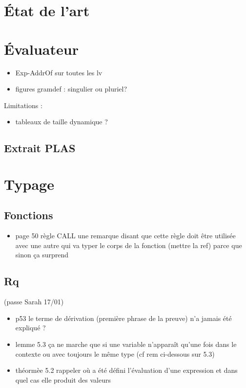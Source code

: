 \section{État de l'art}%



\section{Évaluateur} %

\begin{itemize}
\item Exp-AddrOf sur toutes les lv
\item figures gramdef : singulier ou pluriel?
\end{itemize}

Limitations :

\begin{itemize}
\item tableaux de taille dynamique ?
\end{itemize}

\subsection*{Extrait PLAS}




\section{Typage}%

\subsection*{Fonctions}

\begin{itemize}
\item
  page 50 règle CALL une remarque disant que cette règle doit être
  utilisée avec une autre qui va typer le corps de la fonction (mettre
  la ref) parce que sinon ça surprend
\end{itemize}

\subsection*{Rq}
(passe Sarah 17/01)

\begin{itemize}
\item
  p53 le terme de dérivation (première phrase de la preuve) n'a jamais
  été expliqué ?
\item
  lemme 5.3 ça ne marche que si une variable n'apparaît qu'une fois dans
  le contexte ou avec toujours le même type (cf rem ci-dessous sur 5.3)
\item
  théormèe 5.2 rappeler où a été défini l'évaluation d'une expression et
  dans quel cas elle produit des valeurs
\end{itemize}%

